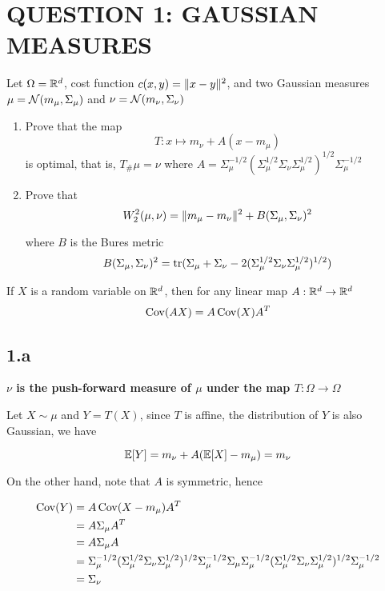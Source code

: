 \section{QUESTION 1: GAUSSIAN MEASURES}

\begin{problem}
	Let $\Omega = \mathbb{R}^d$, cost function $c(x, y) = \lVert x - y\rVert^2$, and two Gaussian measures $\mu = \mathcal{N}(m_\mu, \Sigma_\mu)$ and $\nu = \mathcal{N}(m_\nu, \Sigma_\nu)$
	\begin{enumerate}[label=(\alph*)]
		\item Prove that the map 
		$$
			T: x \mapsto m_\nu + A(x - m_\mu)
		$$
		is optimal, that is, $T_{\#} \mu = \nu$ where $A = \Sigma_\mu^{-1/2}(\Sigma_\mu^{1/2} \Sigma_\nu \Sigma_\mu^{1/2})^{1/2} \Sigma_\mu^{-1/2}$
		
		\item Prove that
		$$
			W_2^2(\mu, \nu) = \lVert m_\mu - m_\nu\rVert^2 + B(\Sigma_\mu, \Sigma_\nu)^2
		$$
		
		where $B$ is the Bures metric
		$$
			B(\Sigma_\mu, \Sigma_\nu)^2 = \operatorname{tr}(\Sigma_\mu + \Sigma_\nu - 2(\Sigma_\mu^{1/2} \Sigma_\nu \Sigma_\mu^{1/2})^{1/2})
		$$
	\end{enumerate}
\end{problem}

\begin{lemma}
	If $X$ is a random variable on $\mathbb{R}^d$, then for any linear map $A: \mathbb{R}^d \to \mathbb{R}^d$
	$$
		\operatorname{Cov}(AX) = A \operatorname{Cov}(X) A^T
	$$
\end{lemma}

\subsection{1.a}

\textbf{$\nu$ is the push-forward measure of $\mu$ under the map $T: \Omega \to \Omega$}

Let $X \sim \mu$ and $Y = T(X)$, since $T$ is affine, the distribution of $Y$ is also Gaussian, we have 

$$
	\mathbb{E}[Y] = m_\nu + A (\mathbb{E}[X] - m_\mu) = m_\nu
$$

On the other hand, note that $A$ is symmetric, hence

\begin{align*}
	\operatorname{Cov}(Y)
	&= A \operatorname{Cov}(X - m_\mu) A^T\\
	&= A \Sigma_\mu A^T \\
	&= A \Sigma_\mu A \\
	&= \Sigma_\mu^{-1/2}(\Sigma_\mu^{1/2} \Sigma_\nu \Sigma_\mu^{1/2})^{1/2} \Sigma_\mu^{-1/2} \Sigma_\mu \Sigma_\mu^{-1/2}(\Sigma_\mu^{1/2} \Sigma_\nu \Sigma_\mu^{1/2})^{1/2} \Sigma_\mu^{-1/2} \\
	&= \Sigma_\nu
\end{align*}

